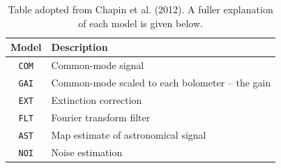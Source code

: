 \documentclass[twoside,11pt]{article}
\renewcommand{\_}{\texttt{\symbol{95}}}
\begin{document}
\setlength{\extrarowheight}{3pt}
\begin{table}
\centering
\begin{tabular}{c|l}
\hline
\textbf{Model} &\hspace{0.2cm} \textbf{Description} \\
\hline
\texttt{COM}&\hspace{0.2cm} Common-mode signal\\
\texttt{GAI}&\hspace{0.2cm} Common-mode scaled to each bolometer -- the gain\\
\texttt{EXT}&\hspace{0.2cm} Extinction correction\\
\texttt{FLT}&\hspace{0.2cm} Fourier transform filter\\
\texttt{AST}&\hspace{0.2cm} Map estimate of astronomical signal\\
\texttt{NOI}&\hspace{0.2cm} Noise estimation\\
\hline
\end{tabular}
\label{tab:mods}
\caption{\small Table adopted from Chapin et al. (2012). A fuller explanation of each model is given below.}
\end{table}

\raggedbottom
\end{document}
